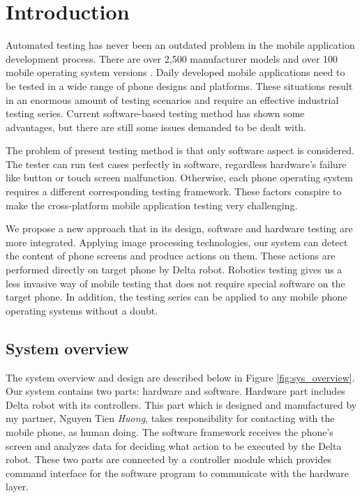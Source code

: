 \chapter{Introduction}

Automated testing has never been an outdated problem in the mobile application development process. There are over 2,500 manufacturer models and over 100 mobile operating system versions \cite{crittercism}. Daily developed mobile applications need to be tested in a wide range of phone designs and platforms. These situations result in an enormous amount of testing scenarios and require an effective industrial testing series. Current software-based testing method has shown some advantages, but there are still some issues demanded to be dealt with.

The problem of present testing method is that only software aspect is considered. The tester can run test cases perfectly in software, regardless hardware's failure like button or touch screen malfunction. Otherwise, each phone operating system requires a different corresponding testing framework. These factors conspire to make the cross-platform mobile application testing very challenging. \nocite{weinman_thesis}

We propose a new approach that in its design, software and hardware testing are more integrated. Applying image processing technologies, our system can detect the content of phone screens and produce actions on them. These actions are performed directly on target phone by Delta robot. Robotics testing gives us a less invasive way of mobile testing that does not require special software on the target phone. In addition, the testing series can be applied to any mobile phone operating systems without a doubt.

\section{System overview}
The system overview and design are described below in Figure \ref{fig:sys_overview}. Our system contains two parts: hardware and software. Hardware part includes Delta robot with its controllers. This part which is designed and manufactured by my partner, Nguyen Tien \textit{Huong}, takes responsibility for contacting with the mobile phone, as human doing. The software framework receives the phone's screen and analyzes data for deciding what action to be executed by the Delta robot. These two parts are connected by a controller module which provides command interface for the software program to communicate with the hardware layer.

